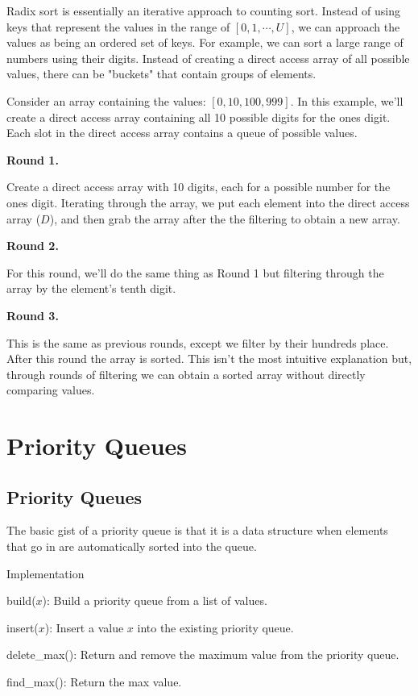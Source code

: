 \documentclass[11pt,a4paper,english]{report}
\begin{document}
Radix sort is essentially an iterative approach to counting sort. Instead of using keys that represent the values in the range of $[0, 1, \dotsb, U]$, we can approach the values as being an ordered set of keys. For example, we can sort a large range of numbers using their digits. Instead of creating a direct access array of all possible values, there can be "buckets" that contain groups of elements.


\bigskip
\noindent Consider an array containing the values: $[0, 10, 100, 999]$. In this example, we'll create a direct access array containing all 10 possible digits for the ones digit. Each slot in the direct access array contains a queue of possible values. 

\bigskip \noindent \textbf{Round 1.} 

\noindent Create a direct access array with 10 digits, each for a possible number for the ones digit. Iterating through the array, we put each element into the direct access array ($D$), and then grab the array after the the filtering to obtain a new array.

\bigskip
\noindent \textbf{Round 2.}

\noindent For this round, we'll do the same thing as Round 1 but filtering through the array by the element's tenth digit.

\bigskip

\noindent \textbf{Round 3.} 

\noindent This is the same as previous rounds, except we filter by their hundreds place. After this round the array is sorted. This isn't the most intuitive explanation but, through rounds of filtering we can obtain a sorted array without directly comparing values.

\chapter{Priority Queues}

\section{Priority Queues}

The basic gist of a priority queue is that it is a data structure when elements that go in are automatically sorted into the queue.

\bigskip

\begin{bluebox}{Implementation}{

    \begin{itemize} {

        \item build($x$): Build a priority queue from a list of values.
        \item insert($x$): Insert a value $x$ into the existing priority queue.
        \item delete\_max(): Return and remove the maximum value from the priority queue.
        \item find\_max(): Return the max value.

    } \end{itemize}


}\end{bluebox}
\end{document}
